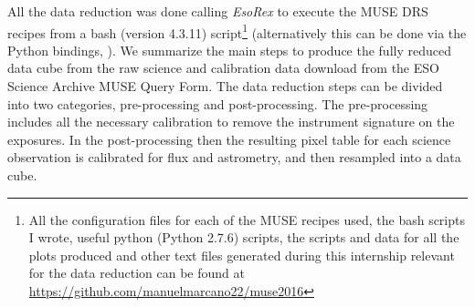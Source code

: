 All the data reduction was done calling \emph{EsoRex} to execute the MUSE DRS recipes from a bash (version 4.3.11) script\footnote{All the configuration files for each of the MUSE recipes used, the bash scripts I wrote, useful python (Python 2.7.6) scripts, the scripts and data for all the plots produced and other text files generated during this internship relevant for the data reduction can be found at \url{https://github.com/manuelmarcano22/muse2016}} (alternatively this can be done via the Python bindings, \cite{streicher_python_2012}). We summarize the main steps to produce the fully reduced data cube from the raw science and calibration data download from the ESO Science Archive MUSE Query Form. The data reduction steps can be divided into two categories, pre-processing and post-processing. The pre-processing includes all the necessary calibration to remove the instrument signature on the exposures. In the post-processing then the resulting pixel table for each science observation is calibrated for flux and astrometry, and then resampled into a data cube.

